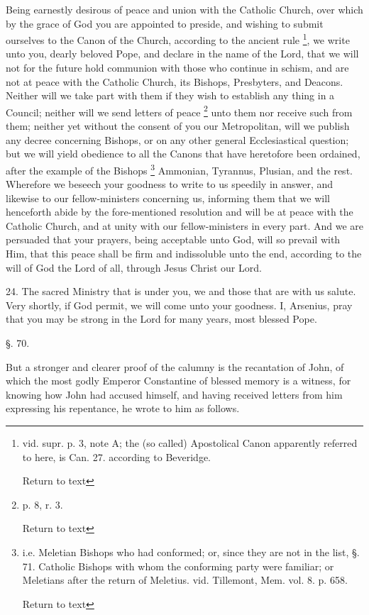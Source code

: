 Being earnestly desirous of peace and union with
the Catholic Church, over which by the grace of God you are appointed
to preside, and wishing to submit ourselves to the Canon of the
Church, according to the ancient rule \footnote{vid. supr. p. 3, note A; the (so called) Apostolical Canon apparently
referred to here, is Can. 27. according to Beveridge.

Return to text}, we write unto you, dearly beloved Pope, and declare in the
name of the Lord, that we will not for the future hold communion with
those who continue in schism, and are not at peace with the Catholic
Church, its Bishops, Presbyters, and Deacons. Neither will we take
part with them if they wish to establish any thing in a Council;
neither will we send letters of peace \footnote{p. 8, r. 3.

Return to text} unto them nor receive such from them; neither yet without the
consent of you our Metropolitan, will we publish any decree concerning
Bishops, or on any other general Ecclesiastical question; but we will
yield obedience to all the Canons that have heretofore been ordained,
after the example of the Bishops \footnote{i.e. Meletian Bishops who had conformed; or, since they are not in the
list, §. 71. Catholic Bishops with whom the conforming party were
familiar; or Meletians after the return of Meletius. vid. Tillemont,
Mem. vol. 8. p. 658.

Return to text} Ammonian, Tyrannus, Plusian, and the rest. Wherefore we beseech
your goodness to write to us speedily in answer, and likewise to our
fellow-ministers concerning us, informing them that we will henceforth
abide by the fore-mentioned resolution and will be at peace with the
Catholic Church, and at unity with our fellow-ministers in every part.
And we are persuaded that your prayers, being acceptable unto God,
will so prevail with Him, that this peace shall be firm and
indissoluble unto the end, according to the will of God the Lord of
all, through Jesus Christ our Lord.

24. The sacred Ministry that is under you, we and
those that are with us salute. Very shortly, if God permit, we will
come unto your goodness. I, Arsenius, pray that you may be strong in
the Lord for many years, most blessed Pope.

§. 70.

But a stronger and clearer proof of the calumny
is the recantation of John, of which the most godly Emperor
Constantine of blessed memory is a witness, for knowing how John had
accused himself, and having received letters from him expressing his
repentance, he wrote to him as follows.

